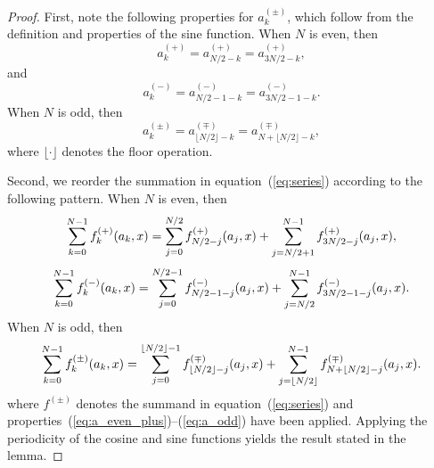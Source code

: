 \documentclass{article}
\begin{document}
\begin{proof}
First, note the following properties for $a^{(\pm)}_k$, which follow from the definition and properties of the sine function.
When $N$ is even, then
\begin{equation}
\label{eq:a_even_plus}
a^{(+)}_k = a^{(+)}_{N/2 - k} = a^{(+)}_{3N/2 - k},
\end{equation}
and
\begin{equation}
\label{eq:a_even_minus}
a^{(-)}_k = a^{(-)}_{N/2 - 1 - k} = a^{(-)}_{3N/2 -1 - k}.
\end{equation}
When $N$ is odd, then
\begin{equation}
\label{eq:a_odd}
a^{(\pm)}_k = a^{(\mp)}_{\lfloor N/2 \rfloor - k} = a^{(\mp)}_{N + \lfloor N/2 \rfloor - k},
\end{equation}
where $\lfloor \cdot \rfloor$ denotes the floor operation.

Second, we reorder the summation in equation~(\ref{eq:series}) according to the following pattern.
When $N$ is even, then
\begin{equation}
\sum_{k=0}^{N-1} f^{(+)}_k\qty(a_k, x) = \sum_{j=0}^{N/2} f^{(+)}_{N/2-j}\qty(a_j, x) + \sum_{j=N/2+1}^{N-1} f^{(+)}_{3N/2-j}\qty(a_j, x),
\end{equation}
\begin{equation}
\sum_{k=0}^{N-1} f^{(-)}_k\qty(a_k, x) = \sum_{j=0}^{N/2-1} f^{(-)}_{N/2-1-j}\qty(a_j, x) + \sum_{j=N/2}^{N-1} f^{(-)}_{3N/2-1-j}\qty(a_j, x).
\end{equation}
When $N$ is odd, then
\begin{equation}
\sum_{k=0}^{N-1} f^{(\pm)}_k\qty(a_k, x) = \sum_{j=0}^{\left\lfloor N/2 \right\rfloor-1} f^{(\mp)}_{\left\lfloor N/2 \right\rfloor-j}\qty(a_j, x) + \sum_{j=\left\lfloor N/2 \right\rfloor}^{N-1} f^{(\mp)}_{N + \left\lfloor N/2 \right\rfloor-j}\qty(a_j, x).
\end{equation}
where $f^{(\pm)}$ denotes the summand in equation~(\ref{eq:series}) and properties~(\ref{eq:a_even_plus})--(\ref{eq:a_odd}) have been applied.
Applying the periodicity of the cosine and sine functions yields the result stated in the lemma.
\end{proof}
\end{document}

